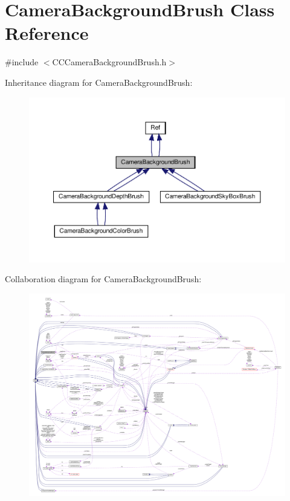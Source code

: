 \hypertarget{classCameraBackgroundBrush}{}\section{Camera\+Background\+Brush Class Reference}
\label{classCameraBackgroundBrush}


{\ttfamily \#include $<$C\+C\+Camera\+Background\+Brush.\+h$>$}



Inheritance diagram for Camera\+Background\+Brush\+:
\nopagebreak
\begin{figure}[H]
\begin{center}
\leavevmode
\includegraphics[width=350pt]{classCameraBackgroundBrush__inherit__graph}
\end{center}
\end{figure}


Collaboration diagram for Camera\+Background\+Brush\+:
\nopagebreak
\begin{figure}[H]
\begin{center}
\leavevmode
\includegraphics[width=350pt]{classCameraBackgroundBrush__coll__graph}
\end{center}
\end{figure}

